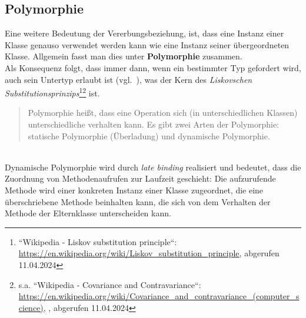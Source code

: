 \subsection*{Polymorphie}
Eine weitere Bedeutung der Vererbungsbeziehung, ist, dass eine Instanz einer Klasse genauso verwendet werden kann wie eine Instanz seiner übergeordneten Klasse.
Allgemein fasst man dies unter \textbf{Polymorphie} zusammen.\\
Als Konsequenz folgt, dass immer dann, wenn ein bestimmter Typ gefordert wird, auch sein Untertyp erlaubt ist (vgl.~\cite[466]{Ull23}), was der Kern des \textit{Liskovschen Substitutionsprinzips}\footnote{
    ``Wikipedia - Liskov substitution principle``: \url{https://en.wikipedia.org/wiki/Liskov_substitution_principle}, abgerufen 11.04.2024
}\footnote{
    s.a. ``Wikipedia - Covariance and Contravariance``: \url{https://en.wikipedia.org/wiki/Covariance_and_contravariance_(computer_science)}, , abgerufen 11.04.2024
} ist.\\


\begin{tcolorbox}[title=Polymorphie-Prinzip]
    \blockquote[{\cite[67]{Oes05}}]{
    Polymorphie heißt, dass eine Operation sich (in unterschiedlichen Klassen) unterschiedliche verhalten kann. Es gibt zwei Arten der Polymorphie: statische Polymorphie (Überladung) und dynamische Polymorphie.
    }\\
    \noindent
    Dynamische Polymorphie wird durch \textit{late binding} realisiert und bedeutet, dass die Zuordnung von Methodenaufrufen zur Laufzeit geschieht: Die aufzurufende Methode wird einer konkreten Instanz einer Klasse zugeordnet,
    die eine überschriebene Methode beinhalten kann, die sich von dem Verhalten der Methode der Elternklasse unterscheiden kann.
\end{tcolorbox}
